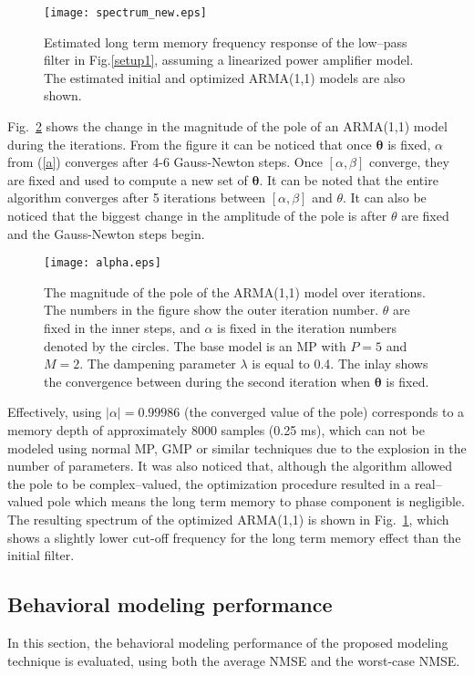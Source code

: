 \documentclass[journal]{IEEEtran}
\begin{document}
\begin{figure}
\centering
\texttt{[image: spectrum\_new.eps]}
\caption{Estimated long term memory frequency response of the low--pass filter in Fig.\ref{setup1}, assuming a linearized power amplifier model. The estimated initial and optimized ARMA(1,1) models are also shown.} \label{spectrum}
\end{figure}

Fig.~\ref{alpha} shows the change in the magnitude of the pole of an ARMA(1,1) model during the iterations. From the figure it can be noticed that once $\bm{\theta}$ is fixed, $\alpha$ from (\ref{a}) converges after 4-6 Gauss-Newton steps. Once $[\alpha,\beta]$ converge, they are fixed and used to compute a new set of $\bm{\theta}$. It can be noted that the entire algorithm converges after 5 iterations between $[\alpha,\beta]$ and $\theta$. It can also be noticed that the biggest change in the amplitude of the pole is after $\theta$ are fixed and the Gauss-Newton steps begin.
\begin{figure}
\centering
\texttt{[image: alpha.eps]}
\caption{The magnitude of the pole of the ARMA(1,1) model over iterations. The numbers in the figure show the outer iteration number. $\theta$ are fixed in the inner steps, and $\alpha$ is fixed in the iteration numbers denoted by the circles. The base model is an MP with $P = 5$ and $M = 2$. The dampening parameter $\lambda$ is equal to 0.4. The inlay shows the convergence between during the second iteration when $\bm{\theta}$ is fixed.} \label{alpha}
\end{figure}

Effectively, using $|\alpha| = 0.99986$ (the converged value of the pole) corresponds to a memory depth of approximately 8000 samples (0.25 ms), which can not be modeled using normal MP, GMP or similar techniques due to the explosion in the number of parameters. It was also noticed that, although the algorithm allowed the pole to be complex--valued, the optimization procedure resulted in a real--valued pole which means the long term memory to phase component is negligible. The resulting spectrum of the optimized ARMA(1,1) is shown in Fig.~\ref{spectrum}, which shows a slightly lower cut-off frequency for the long term memory effect than the initial filter.

\subsection{Behavioral modeling performance}
In this section, the behavioral modeling performance of the proposed modeling technique is evaluated, using both the average NMSE and the worst-case NMSE.
\end{document}
